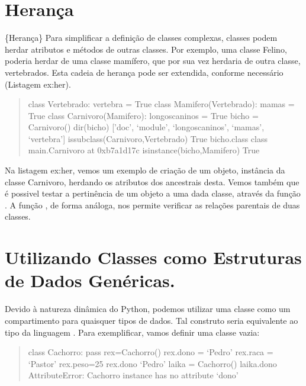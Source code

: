 \documentclass[a4paper,10pt,brazil]{sphinxmanual}
\begin{document}
\section{Herança}
\label{CapObj:heranca}
\{Herança\} Para simplificar a definição de classes complexas,
classes podem herdar atributos e métodos de outras classes. Por
exemplo, uma classe Felino, poderia herdar de uma classe mamífero,
que por sua vez herdaria de outra classe, vertebrados. Esta cadeia
de herança pode ser extendida, conforme necessário (Listagem
ex:her).
\begin{quote}

class Vertebrado: vertebra = True class Mamifero(Vertebrado): mamas
= True class Carnivoro(Mamifero): longoscaninos = True bicho =
Carnivoro() dir(bicho) {[}'doc', `module', `longoscaninos', `mamas',
`vertebra'{]} issubclass(Carnivoro,Vertebrado) True bicho.class class
main.Carnivoro at 0xb7a1d17c isinstance(bicho,Mamifero) True
\end{quote}

Na listagem ex:her, vemos um exemplo de criação de um objeto,
instância da classe Carnivoro, herdando os atributos dos ancestrais
desta. Vemos também que é possivel testar a pertinência de um
objeto a uma dada classe, através da função . A
função , de forma análoga, nos permite verificar as
relações parentais de duas classes.


\section{Utilizando Classes como Estruturas de Dados Genéricas.}
\label{CapObj:utilizando-classes-como-estruturas-de-dados-genericas}
Devido à natureza dinâmica do Python, podemos utilizar uma classe
como um compartimento para quaisquer tipos de dados. Tal construto
seria equivalente ao tipo  da linguagem . Para
exemplificar, vamos definir uma classe vazia:
\begin{quote}

class Cachorro: pass rex=Cachorro() rex.dono = `Pedro' rex.raca =
`Pastor' rex.peso=25 rex.dono `Pedro' laika = Cachorro() laika.dono
AttributeError: Cachorro instance has no attribute `dono'
\end{quote}
\end{document}
